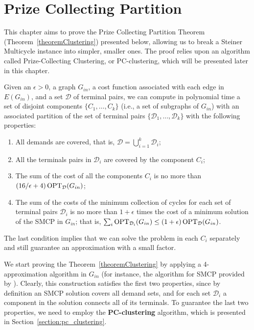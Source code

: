 \chapter{Prize Collecting Partition}
\label{chapter:pc-partition}

This chapter aims to prove the Prize Collecting Partition Theorem (Theorem~\ref{theoremClustering}) presented below, allowing us to break a Steiner Multicycle instance into simpler, smaller ones. The proof relies upon an algorithm called Prize-Collecting Clustering, or PC-clustering, which will be presented later in this chapter.

\begin{theorem} \label{theoremClustering}
Given an \(\epsilon > 0\), a graph \(G_{in}\), a cost function associated with each edge in \(E(G_{in})\), and a set \(\mathcal{D}\) of terminal pairs, we can compute in polynomial time a set of disjoint components \(\{C_1, \dots, C_k\}\) (i.e., a set of subgraphs of \(G_{in}\)) with an associated partition of the set of terminal pairs \(\{\mathcal{D}_1, \dots, \mathcal{D}_k\}\) with the following properties:
\begin{enumerate}
    \item All demands are covered, that is, \(\mathcal{D} = \bigcup_{i=1}^k \mathcal{D}_i\); \label{condition_t_clust:1}
    \item All the terminals pairs in \(\mathcal{D}_i\) are covered by the component \(C_i\); \label{condition_t_clust:2}
    \item The sum of the cost of all the components \(C_i\) is no more than \((16/\epsilon + 4) \operatorname{\textrm{OPT}}_{\mathcal{D}}(G_{in})\); \label{condition_t_clust:3}
    \item The sum of the costs of the minimum collection of cycles for each set of terminal pairs \(\mathcal{D}_i\) is no more than \(1 + \epsilon\) times the cost of a minimum solution of the SMCP in \(G_{in}\); that is, \(\sum_i \operatorname{\textrm{OPT}}_{\mathcal{D}_i} (G_{in}) \leq (1 + \epsilon) \operatorname{\textrm{OPT}}_{\mathcal{D}} (G_{in})\). \label{condition_t_clust:4}
\end{enumerate}
\end{theorem}

The last condition implies that we can solve the problem in each \(C_i\) separately and still guarantee an approximation with a small factor.

We start proving the Theorem~\ref{theoremClustering} by applying a 4-approximation algorithm in \(G_{in}\) (for instance, the algorithm for SMCP provided by \cite{Pereira2018TheSM}). Clearly, this construction satisfies the first two properties, since by definition an SMCP solution covers all demand sets, and for each set \(\mathcal{D}_i\) a component in the solution connects all of its terminals. To guarantee the last two properties, we need to employ the \textbf{PC-clustering} algorithm, which is presented in Section~\ref{section:pc_clustering}.

